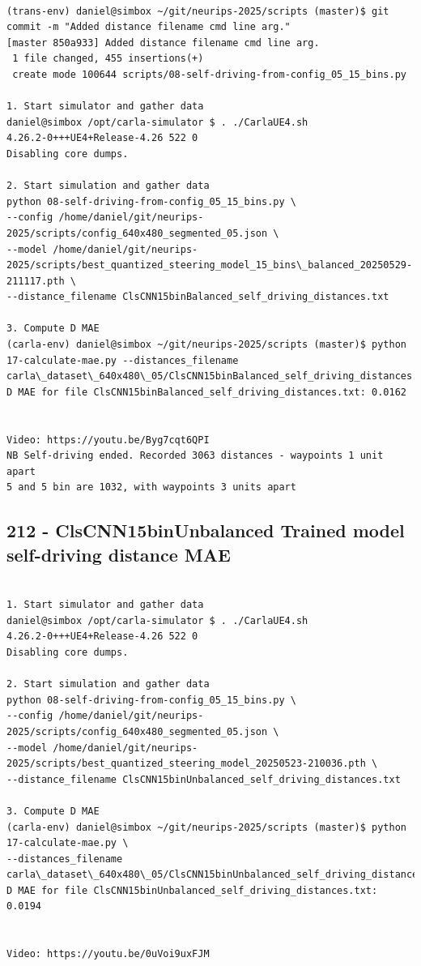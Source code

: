 \begin{verbatim}

(trans-env) daniel@simbox ~/git/neurips-2025/scripts (master)$ git commit -m "Added distance filename cmd line arg."
[master 850a933] Added distance filename cmd line arg.
 1 file changed, 455 insertions(+)
 create mode 100644 scripts/08-self-driving-from-config_05_15_bins.py
 
1. Start simulator and gather data
daniel@simbox /opt/carla-simulator $ . ./CarlaUE4.sh 
4.26.2-0+++UE4+Release-4.26 522 0
Disabling core dumps.

2. Start simulation and gather data
python 08-self-driving-from-config_05_15_bins.py \
--config /home/daniel/git/neurips-2025/scripts/config_640x480_segmented_05.json \
--model /home/daniel/git/neurips-2025/scripts/best_quantized_steering_model_15_bins\_balanced_20250529-211117.pth \
--distance_filename ClsCNN15binBalanced_self_driving_distances.txt

3. Compute D MAE
(carla-env) daniel@simbox ~/git/neurips-2025/scripts (master)$ python 17-calculate-mae.py --distances_filename carla\_dataset\_640x480\_05/ClsCNN15binBalanced_self_driving_distances.txt
D MAE for file ClsCNN15binBalanced_self_driving_distances.txt: 0.0162


Video: https://youtu.be/Byg7cqt6QPI
NB Self-driving ended. Recorded 3063 distances - waypoints 1 unit apart
5 and 5 bin are 1032, with waypoints 3 units apart
\end{verbatim}


\subsection{212 - ClsCNN15binUnbalanced Trained model self-driving distance MAE}
\label{app_res:212}

\begin{verbatim}

1. Start simulator and gather data
daniel@simbox /opt/carla-simulator $ . ./CarlaUE4.sh 
4.26.2-0+++UE4+Release-4.26 522 0
Disabling core dumps.

2. Start simulation and gather data
python 08-self-driving-from-config_05_15_bins.py \
--config /home/daniel/git/neurips-2025/scripts/config_640x480_segmented_05.json \
--model /home/daniel/git/neurips-2025/scripts/best_quantized_steering_model_20250523-210036.pth \
--distance_filename ClsCNN15binUnbalanced_self_driving_distances.txt

3. Compute D MAE
(carla-env) daniel@simbox ~/git/neurips-2025/scripts (master)$ python 17-calculate-mae.py \
--distances_filename carla\_dataset\_640x480\_05/ClsCNN15binUnbalanced_self_driving_distances.txt
D MAE for file ClsCNN15binUnbalanced_self_driving_distances.txt: 0.0194


Video: https://youtu.be/0uVoi9uxFJM
    
\end{verbatim}

